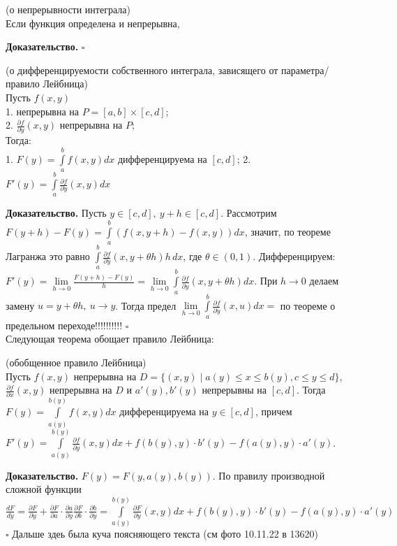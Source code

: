 \begin{theor}
    (о непрерывности интеграла)\\
    Если функция определена и непрерывна, 
\end{theor}
\textbf{Доказательство.}  
$\square$ \\

\begin{theor}
    (о дифференцируемости собственного интеграла, зависящего от параметра/
    правило Лейбница)\\
    Пусть $f(x,y)$ \\
    1. непрерывна на  $P=[a,b]\times[c,d]$;\\
    2. $\frac{\partial f}{\partial y}(x,y)$ непрерывна на $P$;\\
    Тогда:\\
    1. $F(y)=\int\limits_{a}^{b} f(x,y)dx$ дифференцируема на $[c,d]$;
    2. $F'(y)=\int\limits_{a}^{b}\frac{\partial f}{\partial y}(x,y)dx$
\end{theor}
\textbf{Доказательство.} Пусть $y\in[c,d],~y+h\in[c,d]$. 
Рассмотрим  $F(y+h)-F(y)=\int\limits_{a}^{b} (f(x,y+h)-f(x,y))dx$, 
значит, по теореме Лагранжа это равно $\int\limits_{a}^{b}
\frac{\partial f}{\partial y}(x,y+\theta h)h\,dx$, где $\theta\in(0,1)$. 
Дифференцируем:
$F'(y)=\lim\limits_{h \to 0}\frac{F(y+h)-F(y)}{h}=\lim\limits_{h \to 0}
\int\limits_{a}^{b} \frac{\partial f}{\partial y}(x,y+\theta h)dx$.
При $h\to 0$ делаем замену  $u=y+\theta h,~u\to y$. Тогда предел
 $\lim\limits_{h \to 0}
\int\limits_{a}^{b} \frac{\partial f}{\partial y}(x,u)dx=$
по теореме о предельном переходе!!!!!!!!!!
$\square$ \\
Следующая теорема обощает правило Лейбница:
\begin{theor} (обобщенное правило Лейбница)\\
    Пусть $f(x,y)$ непрерывна на  $D=\{(x,y)\mid a(y)\leqslant x\leqslant 
    b(y),c\leqslant y\leqslant d\}$, $\frac{\partial f}{\partial x}(x,y)$ 
    непрерывна на $D$ и $a'(y),b'(y)$ непрерывны на  $[c,d]$. Тогда
     $F(y)=\int\limits_{a(y)}^{b(y)}f(x,y)dx$ дифференцируема на 
     $y\in[c,d]$, причем  $F'(y)=\int\limits_{a(y)}^{b(y)} 
     \frac{\partial f}{\partial y} (x,y)dx+f(b(y),y)\cdot b'(y)-
     f(a(y),y)\cdot a'(y)$.
\end{theor}
\textbf{Доказательство.}  $F(y)=F(y,a(y),b(y))$. По правилу производной
сложной функции  $\frac{dF}{dy}=\frac{\partial F}{\partial y}+
\frac{\partial F}{\partial a}\cdot \frac{\partial a}{\partial y} 
\frac{\partial F}{\partial b}\cdot \frac{\partial b}{\partial y}=
\int\limits_{a(y)}^{b(y)}\frac{\partial F}{\partial y}(x,y)dx
+f(b(y),y)\cdot b'(y)-f(a(y),y)\cdot a'(y)$ $\square$ 
Дальше здеь была куча поясняющего текста (см фото 10.11.22 в 13620)


